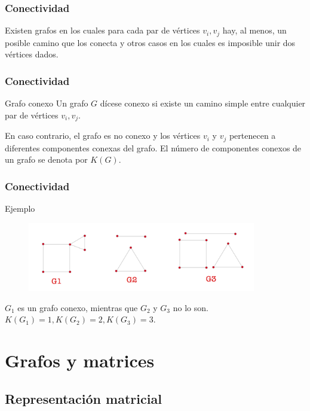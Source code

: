 \documentclass{beamer}
\begin{document}
\begin{frame}
\frametitle{Conectividad}
Existen grafos en los cuales para cada par de v\'ertices $v_i,v_j$ hay, al menos, un posible camino que los conecta y otros casos en los cuales es imposible unir dos v\'ertices dados.
\end{frame}


\begin{frame}
\frametitle{Conectividad}
\begin{block}{Grafo conexo}
Un grafo $G$ d\'icese conexo si existe un camino simple entre cualquier par de v\'ertices $v_i,v_j$.

En caso contrario, el grafo es no conexo y los v\'ertices $v_i$ y $v_j$ pertenecen a diferentes componentes conexas del grafo.
El n\'umero de componentes conexos de un grafo se denota por $K(G)$.
\end{block}
\end{frame}





\begin{frame}
\frametitle{Conectividad}
\begin{block}{Ejemplo}

\begin{figure}[h]
 \label{fig:volumen}
\centering
\includegraphics[height=3cm]{g8}
\end{figure}

$G_1$ es un grafo conexo, mientras que $G_2$ y $G_3$ no lo son. $K(G_1) = 1, K(G_2) = 2, K(G_3) = 3$.
\end{block}
\end{frame}





\section{Grafos y matrices}
\subsection{Representaci\'on matricial}
\end{document}
